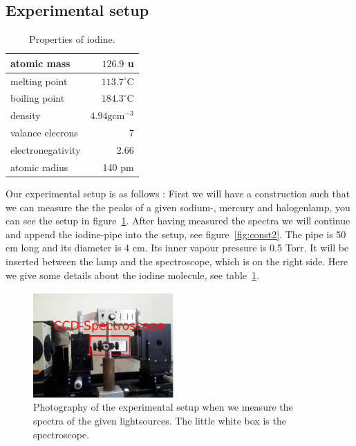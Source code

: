 \subsection{Experimental setup}
\begin{table}
\caption{Properties of iodine.}
\begin{tabular}{| l | r |}
    \hline
    atomic mass   & $126.9$ u \\
    \hline
    melting point & $113.7^{\circ}$C \\
    \hline
    boiling point & $184.3^{\circ}$C \\ 
    \hline
    density & $4.94 \text{gcm}^{-3} $ \\
    \hline
    valance elecrons & 7 \\
    \hline
    electronegativity & 2.66 \\
    \hline
    atomic radius & 140 pm \\
    \hline
\end{tabular}
\label{tab:iodine}
\end{table}


Our experimental setup is as follows \cite{versuchsanleitung}:
First we will have a construction such that we can measure the 
the peaks of a given sodium-, mercury and halogenlamp, you 
can see the setup in figure~\ref{fig:const1}.
After having measured the spectra we will continue and append
the iodine-pipe into the setup, see figure~\ref{fig:const2}.
The pipe is 50 cm long and its diameter is 4 cm. Its inner 
vapour pressure is 0.5 Torr. It will be 
inserted between the lamp and the spectroscope, which is on 
the right side. Here we give some details \cite{weisstein} 
about the iodine molecule, see table~\ref{tab:iodine}.

\begin{figure}
  \begin{center}
    \includegraphics[width=0.48\textwidth]{pics/const1}
  \end{center}
\caption{Photography of the experimental setup when we measure
    the spectra of the given lightsources. The little white box is
    the spectroscope.} 
 \label{fig:const1}

\end{figure}
